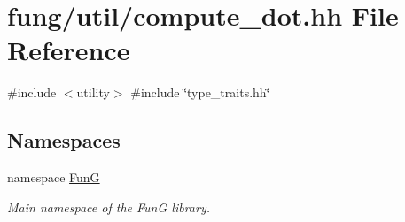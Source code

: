 \hypertarget{compute__dot_8hh}{\section{fung/util/compute\-\_\-dot.hh \-File \-Reference}
\label{compute__dot_8hh}
}
{\ttfamily \#include $<$utility$>$}\*
{\ttfamily \#include \char`\"{}type\-\_\-traits.\-hh\char`\"{}}\*
\subsection*{\-Namespaces}
\begin{DoxyCompactItemize}
\item 
namespace \hyperlink{namespaceFunG}{\-Fun\-G}
\begin{DoxyCompactList}\small\item\em \-Main namespace of the \-Fun\-G library. \end{DoxyCompactList}\end{DoxyCompactItemize}
